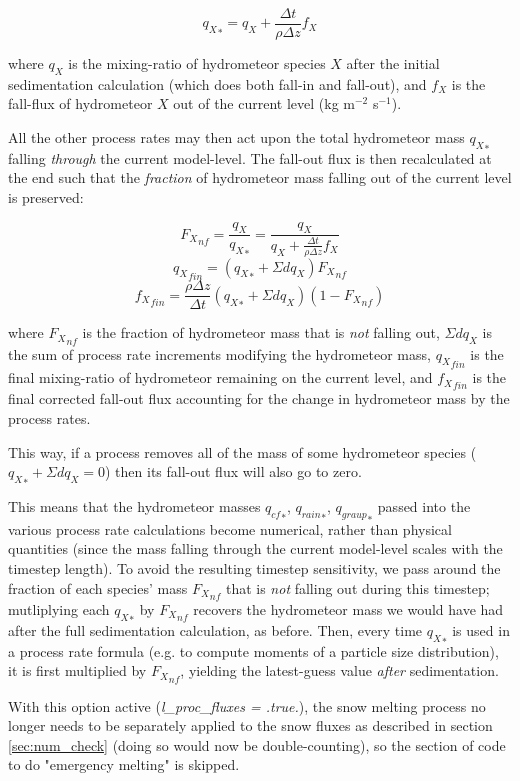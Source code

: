 \documentclass{UMDP_article}
\begin{document}
\[
{q_X}_* = q_X + \frac{\Delta t}{\rho \Delta z} f_X
\]

where $q_X$ is the mixing-ratio of hydrometeor species $X$ after the
initial sedimentation calculation (which does both fall-in and fall-out),
and $f_X$ is the fall-flux of hydrometeor $X$ out of the current level
(kg m$^{-2}$ s$^{-1}$).

All the other process rates may then act upon the total hydrometeor mass
${q_X}_*$ falling {\em through} the current model-level.
The fall-out flux is then recalculated at the end such that the
{\em fraction} of hydrometeor mass falling out of the current level is
preserved:

\[
{F_X}_{nf} = \frac{q_X}{{q_X}_*}
   = \frac{q_X}{q_X + \frac{\Delta t}{\rho \Delta z} f_X}
\]
\[
{q_X}_{fin} = \left( {q_X}_* + \Sigma dq_X \right) {F_X}_{nf}
\]
\[
{f_X}_{fin} = \frac{\rho \Delta z}{\Delta t}
  \left( {q_X}_* + \Sigma dq_X \right) \left( 1 - {F_X}_{nf} \right)
\]

where ${F_X}_{nf}$ is the fraction of hydrometeor mass that is
{\em not} falling out,
$\Sigma dq_X$ is the sum of process rate increments modifying
the hydrometeor mass,
${q_X}_{fin}$ is the final mixing-ratio of hydrometeor remaining
on the current level, and
${f_X}_{fin}$ is the final corrected fall-out flux accounting for the
change in hydrometeor mass by the process rates.

This way, if a process removes all of the mass of some hydrometeor species
(${q_X}_* + \Sigma dq_X = 0$)
then its fall-out flux will also go to zero.

This means that the hydrometeor masses ${q_{cf}}_*$, ${q_{rain}}_*$, ${q_{graup}}_*$
passed into the various process rate calculations become numerical,
rather than physical quantities (since the mass falling through the
current model-level scales with the timestep length).
To avoid the resulting timestep sensitivity, we pass around the fraction of
each species' mass ${F_X}_{nf}$ that is {\em not} falling out during this
timestep; mutliplying each ${q_X}_*$ by ${F_X}_{nf}$
recovers the hydrometeor mass we would have had after the full
sedimentation calculation, as before.
Then, every time ${q_X}_*$ is used in a process rate formula
(e.g. to compute moments of a particle size distribution),
it is first multiplied by ${F_X}_{nf}$, yielding the latest-guess value
{\em after} sedimentation.

With this option active (\textit{l\_proc\_fluxes = .true.}),
the snow melting process no longer needs to be separately applied to the
snow fluxes as described in section \ref{sec:num_check}
(doing so would now be double-counting),
so the section of code to do "emergency melting" is skipped.
\end{document}
